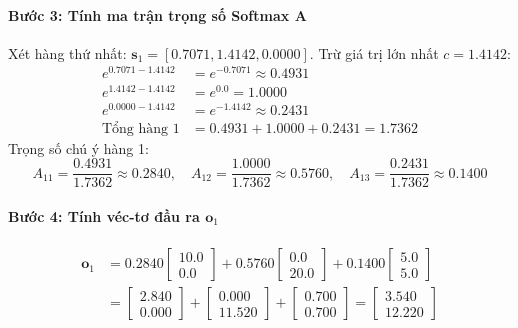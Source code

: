 \begin{example}
\paragraph{Bước 3: Tính ma trận trọng số Softmax $\mathbf{A}$}
Xét hàng thứ nhất: $\mathbf{s}_1 = [0.7071, 1.4142, 0.0000]$.
Trừ giá trị lớn nhất $c = 1.4142$:
\begin{align*}
e^{0.7071 - 1.4142} &= e^{-0.7071} \approx 0.4931 \\
e^{1.4142 - 1.4142} &= e^{0.0} = 1.0000 \\
e^{0.0000 - 1.4142} &= e^{-1.4142} \approx 0.2431 \\
\text{Tổng hàng 1} &= 0.4931 + 1.0000 + 0.2431 = 1.7362
\end{align*}
Trọng số chú ý hàng 1:
\begin{equation*}
A_{11} = \frac{0.4931}{1.7362} \approx 0.2840, \quad A_{12} = \frac{1.0000}{1.7362} \approx 0.5760, \quad A_{13} = \frac{0.2431}{1.7362} \approx 0.1400
\end{equation*}

\paragraph{Bước 4: Tính véc-tơ đầu ra $\mathbf{o}_1$}
\begin{align*}
\mathbf{o}_1 &= 0.2840 \begin{bmatrix} 10.0 \\ 0.0 \end{bmatrix} + 0.5760 \begin{bmatrix} 0.0 \\ 20.0 \end{bmatrix} + 0.1400 \begin{bmatrix} 5.0 \\ 5.0 \end{bmatrix} \\
&= \begin{bmatrix} 2.840 \\ 0.000 \end{bmatrix} + \begin{bmatrix} 0.000 \\ 11.520 \end{bmatrix} + \begin{bmatrix} 0.700 \\ 0.700 \end{bmatrix} = \begin{bmatrix} 3.540 \\ 12.220 \end{bmatrix}
\end{align*}
\end{example}

